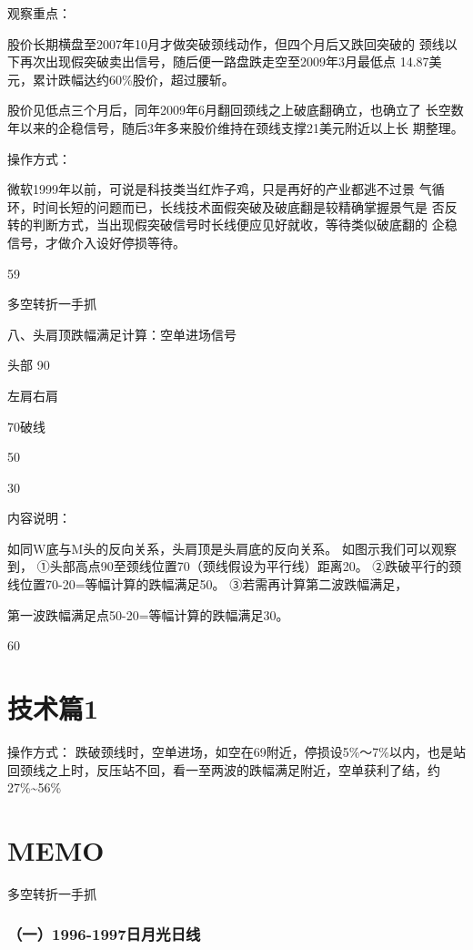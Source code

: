 \documentclass{article}
\begin{document}
观察重点：

股价长期横盘至2007年10月才做突破颈线动作，但四个月后又跌回突破的 颈线以下再次出现假突破卖出信号，随后便一路盘跌走空至2009年3月最低点 14.87美元，累计跌幅达约60\%股价，超过腰斩。

股价见低点三个月后，同年2009年6月翻回颈线之上破底翻确立，也确立了 长空数年以来的企稳信号，随后3年多来股价维持在颈线支撑21美元附近以上长 期整理。

操作方式：

微软1999年以前，可说是科技类当红炸子鸡，只是再好的产业都逃不过景 气循环，时间长短的问题而已，长线技术面假突破及破底翻是较精确掌握景气是 否反转的判断方式，当出现假突破信号时长线便应见好就收，等待类似破底翻的 企稳信号，才做介入设好停损等待。

59

\clearpage

多空转折一手抓

八、头肩顶跌幅满足计算：空单进场信号

头部 90

左肩右肩

70破线

50

30

内容说明：

如同W底与M头的反向关系，头肩顶是头肩底的反向关系。 如图示我们可以观察到， ①头部高点90至颈线位置70（颈线假设为平行线）距离20。 ②跌破平行的颈线位置70-20=等幅计算的跌幅满足50。 ③若需再计算第二波跌幅满足，

第一波跌幅满足点50-20=等幅计算的跌幅满足30。

60

\clearpage

\section{技术篇1}

操作方式： 跌破颈线时，空单进场，如空在69附近，停损设5\%～7\%以内，也是站 回颈线之上时，反压站不回，看一至两波的跌幅满足附近，空单获利了结，约 27\%\textasciitilde{}56\%

\section{MEMO}

\clearpage

多空转折一手抓

\subsubsection{（一）1996-1997日月光日线}
\end{document}
